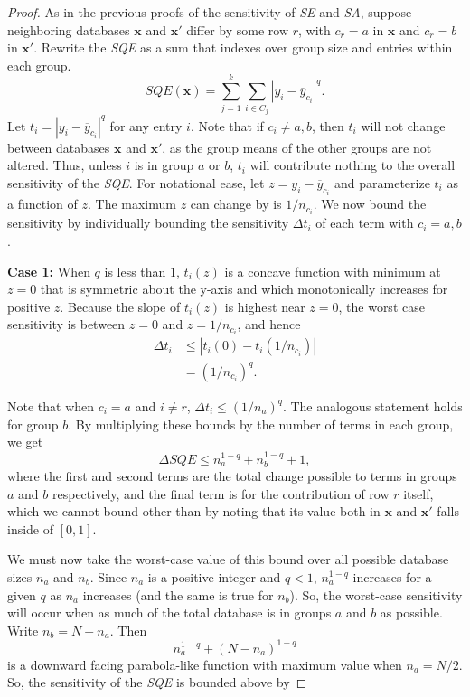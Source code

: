\documentclass[USenglish,oneside]{article}
\newcounter{ab}
\newcounter{ar}
\newcounter{igh}
\newcounter{ms}
\newcommand{\se}{\textit{SE}\xspace}
\newcommand{\sa}{\textit{SA}\xspace}
\newcommand{\sqe}{\textit{SQE}\xspace}
\newcommand{\x}{\ensuremath{\mathbf{x}}\xspace}
\newcommand{\xprime}{\ensuremath{\mathbf{x'}}\xspace}
\begin{document}
\begin{proof}
As in the previous proofs of the sensitivity of \se and \sa, suppose neighboring databases \x and \xprime differ by some row $r$, with $c_r = a$ in \x and $c_r = b$ in \xprime. Rewrite the \sqe as a sum that indexes over group size and entries within each group.
$$\sqe(\x) = \sum_{j=1}^k \sum_{i \in C_j} \left\vert  y_i - \overline{y}_{c_i} \right\vert^q.$$
%
Let $t_i =  \left\vert y_{i} - \overline{y}_{c_i} \right\vert ^q$ for any entry $i$.  Note that if $c_i \neq a,b$, then $t_i$ will not change between databases \x and \xprime, as the group means of the other groups are not altered. Thus, unless $i$ is in group $a$ or $b$, $t_i$ will contribute nothing to the overall sensitivity of the \sqe. For notational ease, let $z = y_i-\overline{y}_{c_i}$ and parameterize $t_i$ as a function of $z$. The maximum $z$ can change by is $1/n_{c_i}$. We now bound the sensitivity by individually bounding the sensitivity $\Delta t_i$ of each term with  $c_i = a,b$.   

\smallskip\noindent\textbf{Case 1:}
When $q$ is less than $1$, $t_i(z)$ is a concave function with minimum at $z=0$ that is symmetric about the y-axis and which monotonically increases for positive $z$. Because the slope of $t_i(z)$ is highest near $z=0$, the worst case sensitivity is between $z = 0$ and $z = 1/n_{c_i}$, and hence
\begin{align*}
\Delta t_{i} &\le \left\vert t_i(0) - t_i(1/n_{c_i}) \right\vert \\
	&= (1/n_{c_i})^q.
\end{align*}

Note that when $c_i = a$ and $i \neq r$, $\Delta t_i \leq (1/n_a)^q$.  The analogous statement holds for group $b$.  By multiplying these bounds by the number of terms in each group, we get
\begin{equation*}
\Delta \sqe \le  n_a^{1-q} + n_b^{1-q} + 1,
\end{equation*}
where the first and second terms are the total change possible to terms in groups $a$ and $b$ respectively, and the final term is for the contribution of row $r$ itself, which we cannot bound other than by noting that its value both in \x and \xprime falls inside of $[0,1]$.

We must now take the worst-case value of this bound over all possible database sizes $n_a$ and $n_b$.  Since $n_a$ is a positive integer and $q<1$, $n_a^{1-q}$ increases for a given $q$ as $n_a$ increases (and the same is true for $n_b$). So, the worst-case sensitivity will occur when as much of the total database is in groups $a$ and $b$ as possible. Write $n_b = N-n_a$. Then
$$n_a^{1-q} + (N-n_a)^{1-q}$$
is a downward facing parabola-like function with maximum value when $n_a = N/2$. So, the sensitivity of the \sqe is bounded above by


\end{proof}
\end{document}
